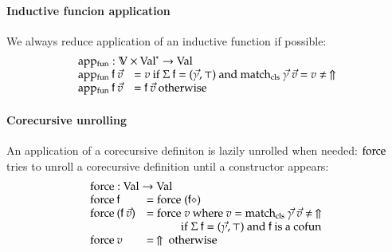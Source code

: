\paragraph*{Inductive funcion application}
We always reduce application of an inductive function if possible:\[
\begin{array}{ll}
\multicolumn{2}{l}{\apf : \cV \times \ves{\Val} \ra \Val}\\
\apf \: \ff \: \vec{v} & = v \mbox{ if } \Sig \: \ff = (\vec{\gamma},\top) \mbox { and } \matchcls \: \vec{\gamma} \: \vec{v} = v \neq \stuck \\ 
\apf \: \ff \: \vec{v} & = \ff \: \vec{v} \mbox { otherwise } 
\end{array}
\]


\paragraph*{Corecursive unrolling}
An application of a corecursive definiton is lazily unrolled when needed: 
$\mathrm{force}$ tries to unroll a corecursive definition until a constructor appears:
\[
\begin{array}{ll}
\multicolumn{2}{l}{\forc : \Val \ra \Val }\\
\forc \: \ff & = \forc \; (\ff \diamond) \\
\forc \: (\ff \: \vec{v}) & = \forc \; v \mbox{ where } v = \matchcls \: \vec{\gamma} \: \vec{v} \neq \stuck \:\\
& \spcx \mbox{ if } \Sig \: \ff = (\vec{\gamma},\top) \mbox { and } \ff \mbox { is a } \cofun\\ 
\forc \: v & = \stuck \mbox{ otherwise}
\end{array}
\]


